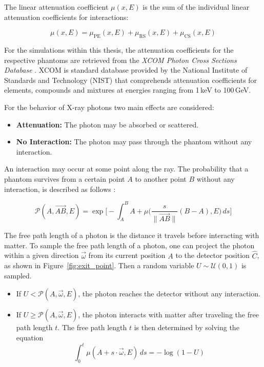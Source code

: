 The linear attenuation coefficient $\mu(x,E)$ is the sum of the individual
linear attenuation coefficients for interactions:

$$\mu(x,E) = \mu_{\text{PE}}(x,E) + \mu_{\text{RS}}(x,E) +
\mu_{\text{CS}}(x,E)$$

For the simulations within this thesis, the attenuation coefficients for the
respective phantoms are retrieved from the \emph{XCOM Photon Cross Sections
Database} \cite{nistXCOM}. XCOM is standard database provided by the National
Institute of Standards and Technology (NIST) that comprehends attenuation
coefficients for elements, compounds and mixtures at energies ranging from
1\,keV to 100\,GeV.

For the behavior of X-ray photons two main effects are considered:
\begin{itemize}
    \item \textbf{Attenuation:} The photon may be absorbed or scattered.
    \item \textbf{No Interaction:} The photon may pass through the phantom
    without any interaction.
\end{itemize}

An interaction may occur at some point along the ray. The probability that a
phantom survives from a certain point $A$ to another point $B$ without any
interaction, is described as follows \cite{bezug2014computed}:

$$\mathcal{P}(A, \overrightarrow{AB},E) = \exp\bigg[-\int_{A}^{B}{A +
\mu\bigg(\frac{s}{\|\overrightarrow{AB}\|}(B-A),E \bigg)\,ds}\bigg]$$

The free path length of a photon is the distance it travels before interacting
with matter. To sample the free path length of a photon, one can project the
photon within a given direction $\vec{\omega}$ from its current position $A$ to
the detector position $\hat{C}$, as shown in Figure~\ref{fig:exit_point}. Then
a random variable $U \sim \mathcal{U}(0,1)$ is sampled.

\begin{itemize}
    \item If $U < \mathcal{P}(A, \vec{\omega}, E)$, the photon reaches the detector without any interaction.
    \item If $U \geq \mathcal{P}(A, \vec{\omega}, E)$, the photon interacts with matter after traveling the free path length $t$. The free path length $t$ is then determined by solving the equation 
    $$\int_{0}^{t}{\mu(A+s\cdot\vec{\omega},E)\,ds} = -\log(1-U)$$
\end{itemize}

